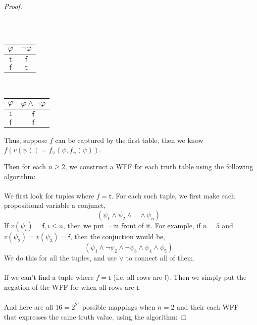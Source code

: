 \documentclass[12pt]{article}
\begin{document}
\begin{proof}
\begin{center}
\begin{tabular}{c|c}
        \end{tabular}
        ~~~
        \begin{tabular}{c|c}
            $\varphi$ & $\neg \varphi$\\ \hline
            $\mathsf{t}$ & $\mathsf{f}$\\
            $\mathsf{f}$ & $\mathsf{t}$\\
        \end{tabular}
        ~~~
        \begin{tabular}{c|c}
            $\varphi$ & $\varphi \land \neg \varphi$\\ \hline
            $\mathsf{t}$ & $\mathsf{f}$\\
            $\mathsf{f}$ & $\mathsf{f}$\\
        \end{tabular}
    \end{center}
    Thus, suppose $f$ can be captured by the first table, then we know $f(v(\psi)) = f_{\lor}(\psi, f_{\neg}(\psi))$.
    
    $$$$
    Then for each $n \geq 2$, we construct a WFF for each truth table using the following algorithm:\\
    \\
    We first look for tuples where $f = \mathsf{t}$.
    For each such tuple, we first make each propositional variable a conjunct,
    $$(\psi_1 \land \psi_2 \land \dots \land \psi_n)$$
    If $v(\psi_i) = \mathsf{f}, i \leq n$, then we put $\neg$ in front of it.
    For example, if $n = 5$ and $v(\psi_2) = v(\psi_3) = \mathsf{f}$, then the conjuction would be,
    $$(\psi_1 \land \neg \psi_2 \land \neg \psi_3 \land \psi_4 \land \psi_5)$$
    We do this for all the tuples, and use $\lor$ to connect all of them.\\
    \\
    If we can't find a tuple where $f = \mathsf{t}$ (i.e. all rows are $\mathsf{f}$).
    Then we simply put the negation of the WFF for when all rows are $\mathsf{t}$.\\
    \\
    And here are all $16 = 2^{2^2}$ possible mappings when $n = 2$ and their each WFF that expresses the same truth value, using the algorithm:


\end{proof}
\end{document}
